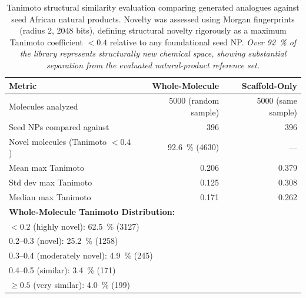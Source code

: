 \documentclass[journal=jcisd8,manuscript=suppinfo]{achemso}
\begin{document}
\begin{table}[!htbp]
\centering
\caption{Tanimoto structural similarity evaluation comparing generated analogues against seed African natural products. Novelty was assessed using Morgan fingerprints (radius \num{2}, \num{2048} bits), defining structural novelty rigorously as a maximum Tanimoto coefficient $< \num{0.4}$ relative to any foundational seed NP. \textit{Over \qty{92}{\percent} of the library represents structurally new chemical space, showing substantial separation from the evaluated natural-product reference set.}}
\label{tab:tanimoto_novelty}
\begin{tabular}{@{}l r r@{}}
\toprule
\textbf{Metric} & \textbf{Whole-Molecule} & \textbf{Scaffold-Only} \\
\midrule
Molecules analyzed & \num{5000} (random sample) & \num{5000} (same sample) \\
Seed NPs compared against & \num{396} & \num{396} \\
Novel molecules (Tanimoto $< \num{0.4}$) & \qty{92.6}{\percent} (\num{4630}) & --- \\
Mean max Tanimoto & \num{0.206} & \num{0.379} \\
Std dev max Tanimoto & \num{0.125} & \num{0.308} \\
Median max Tanimoto & \num{0.171} & \num{0.262} \\
\midrule
\multicolumn{3}{l}{\textbf{Whole-Molecule Tanimoto Distribution:}} \\
\multicolumn{3}{l}{\quad $< \num{0.2}$ (highly novel): \qty{62.5}{\percent} (\num{3127})} \\
\multicolumn{3}{l}{\quad \numrange{0.2}{0.3} (novel): \qty{25.2}{\percent} (\num{1258})} \\
\multicolumn{3}{l}{\quad \numrange{0.3}{0.4} (moderately novel): \qty{4.9}{\percent} (\num{245})} \\
\multicolumn{3}{l}{\quad \numrange{0.4}{0.5} (similar): \qty{3.4}{\percent} (\num{171})} \\
\multicolumn{3}{l}{\quad $\geq \num{0.5}$ (very similar): \qty{4.0}{\percent} (\num{199})} \\
\bottomrule
\end{tabular}
\end{table}
\end{document}

